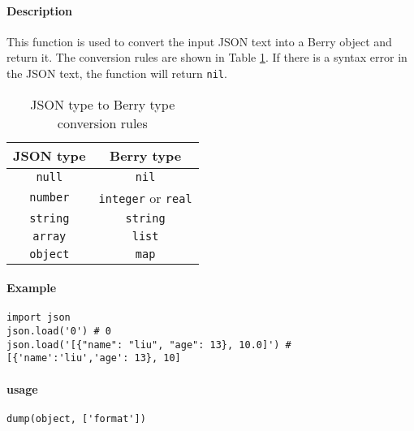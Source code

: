 \paragraph{Description}
This function is used to convert the input JSON text into a Berry object and return it. The conversion rules are shown in Table \ref{tab::json2berry_rule}. If there is a syntax error in the JSON text, the function will return \texttt{nil}.
\begin{table}[htb]
    \centering
    \setlength{\tabcolsep}{18mm}
    \begin{tabular}{cc} \toprule
        \textbf{JSON type} & \textbf{Berry type} \\ \midrule
        \texttt{null} & \texttt{nil} \\
        \texttt{number} & \texttt{integer} or \texttt{real} \\
        \texttt{string} & \texttt{string} \\
        \texttt{array} & \texttt{list} \\
        \texttt{object} & \texttt{map} \\
        \bottomrule
    \end{tabular}
    \caption{JSON type to Berry type conversion rules}
    \label{tab::json2berry_rule}
\end{table}

\paragraph{Example}
\begin{lstlisting}[language=berry, numbers=none]
import json
json.load('0') # 0
json.load('[{"name": "liu", "age": 13}, 10.0]') # [{'name':'liu','age': 13}, 10]
\end{lstlisting}


\paragraph{usage}
\begin{lstlisting}[language=berry, numbers=none]
dump(object, ['format'])
\end{lstlisting}

